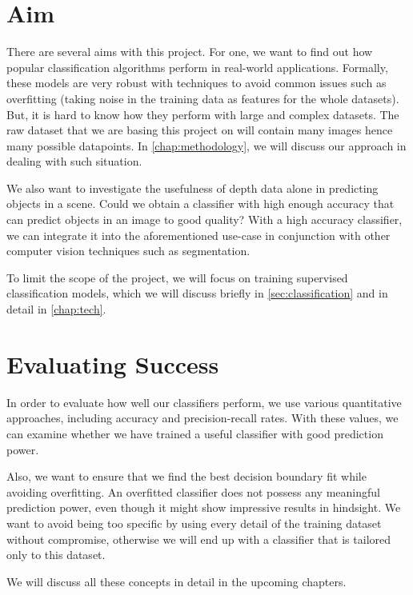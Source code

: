 \section{Aim}
There are several aims with this project. For one, we want to find out how popular classification algorithms perform in real-world applications. Formally, these models are very robust with techniques to avoid common issues such as overfitting (taking noise in the training data as features for the whole datasets). But, it is hard to know how they perform with large and complex datasets. The raw dataset that we are basing this project on will contain many images hence many possible datapoints. In \autoref{chap:methodology}, we will discuss our approach in dealing with such situation.

We also want to investigate the usefulness of depth data alone in predicting objects in a scene. Could we obtain a classifier with high enough accuracy that can predict objects in an image to good quality? With a high accuracy classifier, we can integrate it into the aforementioned use-case in conjunction with other computer vision techniques such as segmentation. 

To limit the scope of the project, we will focus on training supervised classification models, which we will discuss briefly in \autoref{sec:classification} and in detail in \autoref{chap:tech}.

\section{Evaluating Success}
In order to evaluate how well our classifiers perform, we use various quantitative approaches, including accuracy and precision-recall rates. With these values, we can examine whether we have trained a useful classifier with good prediction power. 

Also, we want to ensure that we find the best decision boundary fit while avoiding overfitting. An overfitted classifier does not possess any meaningful prediction power, even though it might show impressive results in hindsight. We want to avoid being too specific by using every detail of the training dataset without compromise, otherwise we will end up with a classifier that is tailored only to this dataset. 

We will discuss all these concepts in detail in the upcoming chapters.
